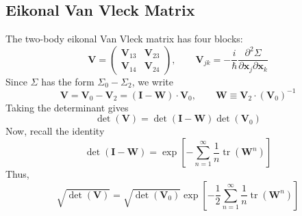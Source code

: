 \subsection{Eikonal Van Vleck Matrix}
The two-body eikonal Van Vleck matrix has four blocks:
\begin{equation}
	\mathbf{V} = \begin{pmatrix}
	\mathbf{V}_{13} & \mathbf{V}_{23} \\
	\mathbf{V}_{14} & \mathbf{V}_{24}
	\end{pmatrix}, \qquad \mathbf{V}_{jk} = - \frac{i}{\hbar} \frac{\partial^{2} \Sigma}{\partial \mathbf{x}_{j} \partial \mathbf{x}_{k}}
\end{equation}
Since $\Sigma$ has the form $\Sigma_{0} - \Sigma_{2}$, we write
\begin{equation}
	\mathbf{V} = \mathbf{V}_{0} - \mathbf{V}_{2} = \left(\mathbf{I} - \mathbf{W} \right) \cdot \mathbf{V}_{0}, \qquad \mathbf{W} \equiv \mathbf{V}_{2} \cdot (\mathbf{V}_{0})^{-1}
\end{equation}
Taking the determinant gives
\begin{equation}
	\det{(\mathbf{V})} = \det{(\mathbf{I} - \mathbf{W})} \det{(\mathbf{V}_{0})}
\end{equation}
Now, recall the identity
\begin{equation}
	\det{(\mathbf{I} - \mathbf{W})} = \exp{\left[- \sum_{n = 1}^{\infty} \frac{1}{n} \operatorname{tr}{(\mathbf{W}^{n})} \right]}
\end{equation}
Thus,
\begin{equation}
	\sqrt{\det{(\mathbf{V})}} = \sqrt{\det{(\mathbf{V}_{0})}} \exp{\left[- \frac{1}{2} \sum_{n = 1}^{\infty} \frac{1}{n} \operatorname{tr}{(\mathbf{W}^{n})} \right]}
\end{equation}

